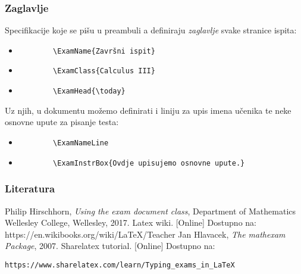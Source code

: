 \documentclass{beamer}
\begin{document}
\begin{frame}[fragile]
\frametitle{Zaglavlje}
Specifikacije koje se pišu u preambuli a definiraju \emph{zaglavlje} svake stranice ispita:
\begin{itemize}
	\item
		\begin{verbatim}
		\ExamName{Završni ispit}
		\end{verbatim}
	\item
		\begin{verbatim}	
		\ExamClass{Calculus III}
		\end{verbatim}
	\item
		\begin{verbatim}
		\ExamHead{\today}
		\end{verbatim}
\end{itemize}

Uz njih, u dokumentu možemo definirati i liniju za upis imena učenika te neke osnovne upute za pisanje testa:
\begin{itemize}
	\item
		\begin{verbatim}
		\ExamNameLine
		\end{verbatim}
	\item
		\begin{verbatim}
		\ExamInstrBox{Ovdje upisujemo osnovne upute.}
		\end{verbatim}
\end{itemize}

\end{frame}

\begin{frame}[fragile]
\frametitle{Literatura}


\begin{thebibliography}{9}
\beamertemplatetextbibitems
{}
    Philip Hirschhorn,
    \textit{Using the exam document class},
    Department of Mathematics
    Wellesley College, Wellesley,
    2017.
    Latex wiki. [Online] Dostupno na:
    https://en.wikibooks.org/wiki/LaTeX/Teacher%
    Jan Hlavacek,
    \textit{The mathexam Package},
    2007.
    Sharelatex tutorial. [Online] Dostupno na:
    \begin{verbatim}
https://www.sharelatex.com/learn/Typing_exams_in_LaTeX    
    \end{verbatim}

\end{thebibliography}
    
\end{frame}
\end{document}
